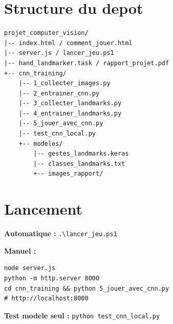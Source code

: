 \documentclass[12pt,a4paper]{article}
\begin{document}
\newpage
\appendix
\section{Structure du depot}

\begin{verbatim}
projet_computer_vision/
|-- index.html / comment_jouer.html
|-- server.js / lancer_jeu.ps1
|-- hand_landmarker.task / rapport_projet.pdf
+-- cnn_training/
    |-- 1_collecter_images.py
    |-- 2_entrainer_cnn.py
    |-- 3_collecter_landmarks.py
    |-- 4_entrainer_landmarks.py
    |-- 5_jouer_avec_cnn.py
    |-- test_cnn_local.py
    +-- modeles/
        |-- gestes_landmarks.keras
        |-- classes_landmarks.txt
        +-- images_rapport/
\end{verbatim}

\section{Lancement}

\textbf{Automatique :} \verb|.\lancer_jeu.ps1|

\textbf{Manuel :}
\begin{verbatim}
node server.js
python -m http.server 8000
cd cnn_training && python 5_jouer_avec_cnn.py
# http://localhost:8000
\end{verbatim}

\textbf{Test modele seul :} \verb|python test_cnn_local.py|
\end{document}
